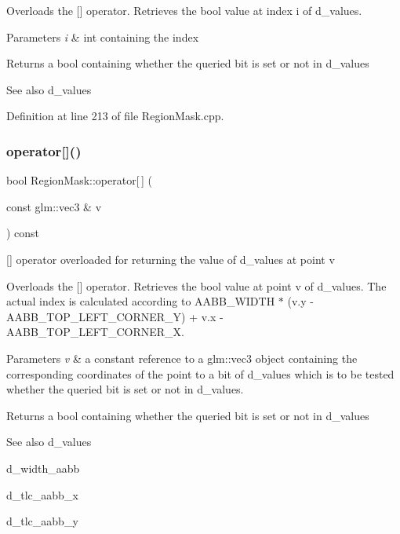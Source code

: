 Overloads the \mbox{[}\mbox{]} operator. Retrieves the bool value at index i of d\+\_\+values.


\begin{DoxyParams}{Parameters}
{\em i} & int containing the index \\
\hline
\end{DoxyParams}
\begin{DoxyReturn}{Returns}
a bool containing whether the queried bit is set or not in d\+\_\+values
\end{DoxyReturn}
\begin{DoxySeeAlso}{See also}
d\+\_\+values 
\end{DoxySeeAlso}


Definition at line 213 of file Region\+Mask.\+cpp.

\mbox{\label{class_region_mask_aa0f79b54ae1e65bc25522d87ef6e7597}} 
\subsubsection{\texorpdfstring{operator[]()}{operator[]()}\hspace{0.1cm}{\footnotesize\ttfamily [2/2]}}
{\footnotesize\ttfamily bool Region\+Mask\+::operator\mbox{[}$\,$\mbox{]} (\begin{DoxyParamCaption}\item[{const glm\+::vec3 \&}]{v }\end{DoxyParamCaption}) const}



\mbox{[}\mbox{]} operator overloaded for returning the value of d\+\_\+values at point v 

Overloads the \mbox{[}\mbox{]} operator. Retrieves the bool value at point v of d\+\_\+values. The actual index is calculated according to A\+A\+B\+B\+\_\+\+W\+I\+D\+TH $\ast$ (v.\+y -\/ A\+A\+B\+B\+\_\+\+T\+O\+P\+\_\+\+L\+E\+F\+T\+\_\+\+C\+O\+R\+N\+E\+R\+\_\+Y) + v.\+x -\/ A\+A\+B\+B\+\_\+\+T\+O\+P\+\_\+\+L\+E\+F\+T\+\_\+\+C\+O\+R\+N\+E\+R\+\_\+X.


\begin{DoxyParams}{Parameters}
{\em v} & a constant reference to a glm\+::vec3 object containing the corresponding coordinates of the point to a bit of d\+\_\+values which is to be tested whether the queried bit is set or not in d\+\_\+values. \\
\hline
\end{DoxyParams}
\begin{DoxyReturn}{Returns}
a bool containing whether the queried bit is set or not in d\+\_\+values
\end{DoxyReturn}
\begin{DoxySeeAlso}{See also}
d\+\_\+values 

d\+\_\+width\+\_\+aabb 

d\+\_\+tlc\+\_\+aabb\+\_\+x 

d\+\_\+tlc\+\_\+aabb\+\_\+y 
\end{DoxySeeAlso}


